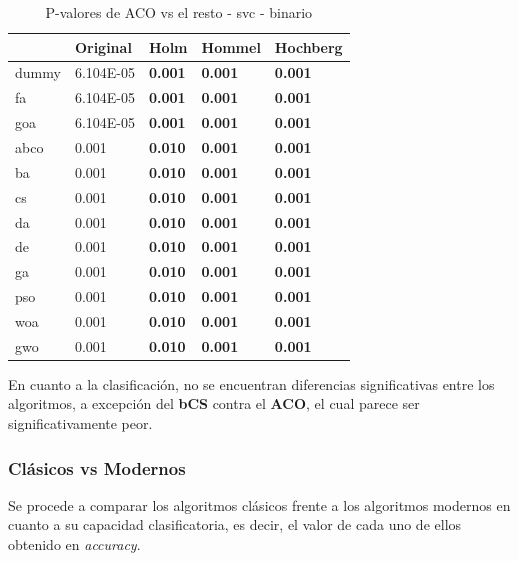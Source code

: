 \begin{table}[htp]
    \centering
    \begin{tabular}{lllll}
        \toprule
        {}    & Original  & Holm           & Hommel         & Hochberg       \\
        \midrule
        dummy & 6.104E-05 & \textbf{0.001} & \textbf{0.001} & \textbf{0.001} \\
        fa    & 6.104E-05 & \textbf{0.001} & \textbf{0.001} & \textbf{0.001} \\
        goa   & 6.104E-05 & \textbf{0.001} & \textbf{0.001} & \textbf{0.001} \\
        abco  & 0.001     & \textbf{0.010} & \textbf{0.001} & \textbf{0.001} \\
        ba    & 0.001     & \textbf{0.010} & \textbf{0.001} & \textbf{0.001} \\
        cs    & 0.001     & \textbf{0.010} & \textbf{0.001} & \textbf{0.001} \\
        da    & 0.001     & \textbf{0.010} & \textbf{0.001} & \textbf{0.001} \\
        de    & 0.001     & \textbf{0.010} & \textbf{0.001} & \textbf{0.001} \\
        ga    & 0.001     & \textbf{0.010} & \textbf{0.001} & \textbf{0.001} \\
        pso   & 0.001     & \textbf{0.010} & \textbf{0.001} & \textbf{0.001} \\
        woa   & 0.001     & \textbf{0.010} & \textbf{0.001} & \textbf{0.001} \\
        gwo   & 0.001     & \textbf{0.010} & \textbf{0.001} & \textbf{0.001} \\
        \bottomrule
    \end{tabular}
    \caption{P-valores de ACO vs el resto - svc - binario}
    \label{tab:p-values_aco_rest_bin_svc}
\end{table}

En cuanto a la clasificación, no se encuentran diferencias significativas entre los algoritmos, a excepción del \textbf{bCS} contra el \textbf{ACO}, el cual parece ser significativamente peor.

\subsubsection{Clásicos vs Modernos}
Se procede a comparar los algoritmos clásicos frente a los algoritmos modernos en cuanto a su capacidad clasificatoria, es decir, el valor de cada uno de ellos obtenido en \textit{accuracy}.\\[6pt]

